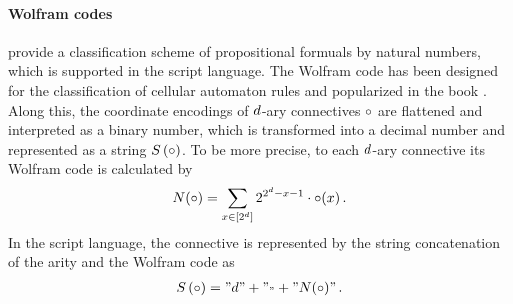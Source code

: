 
\paragraph{Wolfram codes} provide a classification scheme of propositional formuals by natural numbers, which is supported in the script language.
The Wolfram code has been designed for the classification of cellular automaton rules \cite{wolfram_statistical_1983} and popularized in the book \cite{wolfram_new_2002}.
Along this, the coordinate encodings of $d$-ary connectives $\circ$ are flattened and interpreted as a binary number, which is transformed into a decimal number and represented as a string $S\left(\circ\right)$.
To be more precise, to each $d$-ary connective its Wolfram code is calculated by
\begin{align*}
    N(\circ) = \sum_{x\in[2^d]} 2^{2^{d}-x-1} \cdot \circ(x) \, .
\end{align*}
In the script language, the connective is represented by the string concatenation of the arity and the Wolfram code as
\begin{align*}
    S\left(\circ\right) = "d" + "_" + "N(\circ)" \, .
\end{align*}


